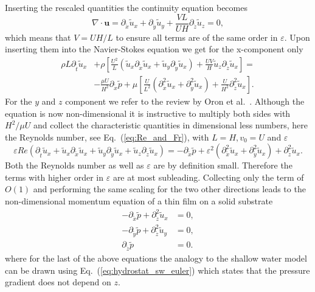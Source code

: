 Inserting the rescaled quantities the continuity equation becomes
\begin{equation}\label{eq:cont_thin_film_1}
     \nabla\cdot\mathbf{u} = \partial_{\tilde{x}} \tilde{u}_x + \partial_{\tilde{y}} \tilde{u}_y + \frac{V L}{U H}\partial_{\tilde{z}} \tilde{u}_z = 0,
\end{equation}
which means that $V = U H/L$ to ensure all terms are of the same order in $\varepsilon$.
Upon inserting them into the Navier-Stokes equation we get for the x-component only
\begin{align}
     \rho L \partial_{\tilde{t}}\tilde{u}_x &+ \rho\left[\frac{U^2}{L}\left(\tilde{u}_x\partial_{\tilde{x}}\tilde{u}_x + \tilde{u}_y\partial_{\tilde{y}}\tilde{u}_x\right) + \frac{U V}{H}\tilde{u}_z\partial_{\tilde{z}}\tilde{u}_x\right] = \nonumber \\ &-\frac{\mu U}{H^2} \partial_{\tilde{x}} \tilde{p} + \mu\left[\frac{U}{L^2}(\partial^2_{\tilde{x}}\tilde{u}_x + \partial^2_{\tilde{y}}\tilde{u}_x) + \frac{U}{H^2}\partial^2_{\tilde{z}}\tilde{u}_x\right].
\end{align}
For the $y$ and $z$ component we refer to the review by Oron et al.~\cite{oronLongscaleEvolutionThin1997}.
Although the equation is now non-dimensional it is instructive to multiply both sides with $H^2/\mu U$ and collect the characteristic quantities in dimensional less numbers, here the Reynolds number, see Eq.~(\ref{eq:Re_and_Fr}), with $L = H, v_0 = U$ and $\varepsilon$  
\begin{equation}
    \varepsilon Re \left(\partial_{\tilde{t}}\tilde{u}_x + \tilde{u}_x\partial_{\tilde{x}}\tilde{u}_x + \tilde{u}_y\partial_{\tilde{y}}\tilde{u}_x + \tilde{u}_z\partial_{\tilde{z}}\tilde{u}_x \right) = -\partial_{\tilde{x}}\tilde{p} + \varepsilon^2\left(\partial^2_{\tilde{x}}\tilde{u}_x + \partial^2_{\tilde{y}}\tilde{u}_x\right) + \partial^2_{\tilde{z}}\tilde{u}_x. 
\end{equation}
Both the Reynolds number as well as $\varepsilon$ are by definition small. 
Therefore the terms with higher order in $\varepsilon$ are at most subleading.
Collecting only the term of $O(1)$ and performing the same scaling for the two other directions leads to the non-dimensional momentum equation of a thin film on a solid substrate
\begin{align}
    -\partial_{\tilde{x}}\tilde{p} + \partial^2_{\tilde{z}}\tilde{u}_x &= 0,  \label{eq:thin_film_pressure_x}\\
    -\partial_{\tilde{y}}\tilde{p} + \partial^2_{\tilde{z}}\tilde{u}_y &= 0,  \label{eq:thin_film_pressure_y}\\
    \partial_{\tilde{z}}\tilde{p} &= 0. \label{eq:thin_film_pressure_z}
\end{align}
where for the last of the above equations the analogy to the shallow water model can be drawn using Eq.~(\ref{eq:hydrostat_sw_euler}) which states that the pressure gradient does not depend on $z$.
 
